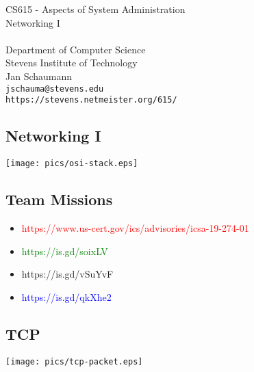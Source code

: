 \documentclass[xga]{xdvislides}
\begin{document}
\setfontphv

\lhead{\slidetitle}                               %
\cfoot{\relax}                               %
\rfoot{\Gray{\today}}

\vspace*{\fill}
\begin{center}
	\Hugesize
		CS615 - Aspects of System Administration\\ [1em]
		Networking I\\ [1em]
	\hspace*{5mm}\blueline\\ [1em]
	\Normalsize
		Department of Computer Science\\
		Stevens Institute of Technology\\
		Jan Schaumann\\
		\verb+jschauma@stevens.edu+\\
		\verb+https://stevens.netmeister.org/615/+
\end{center}
\vspace*{\fill}

\subsection{Networking I}
\vspace*{\fill}
\begin{center}
	\texttt{[image: pics/osi-stack.eps]}
\end{center}
\vspace*{\fill}

\subsection{Team Missions}
\begin{itemize}
	\item \textcolor{red}{https://www.us-cert.gov/ics/advisories/icsa-19-274-01}
	\item \textcolor{green}{https://is.gd/soixLV}
	\item https://is.gd/vSuYvF
	\item \textcolor{blue}{https://is.gd/qkXhe2}
\end{itemize}

\subsection{TCP}
\vspace*{\fill}
\begin{center}
	\texttt{[image: pics/tcp-packet.eps]}
\end{center}
\vspace*{\fill}
\end{document}
